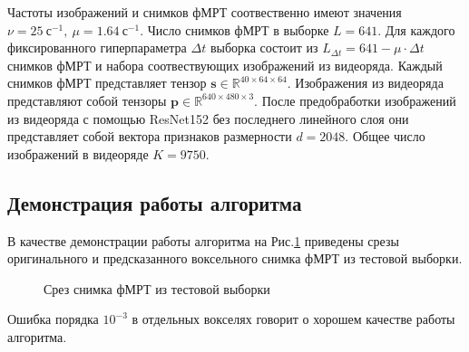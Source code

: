 \documentclass[12pt,twoside]{article}
\begin{document}
Частоты изображений и снимков фМРТ соотвественно имеют значения $\nu = 25~с^{-1},~\mu = 1.64~с^{-1}$.
Число снимков фМРТ в выборке $L = 641$.  
Для каждого фиксированного гиперпараметра $\Delta t$ выборка состоит из $L_{\Delta t} = 641-\mu \cdot \Delta t$  снимков фМРТ и набора соотвествующих изображений из видеоряда. 
Каждый снимков фМРТ представляет тензор $\bm{s} \in \mathbb{R}^{{40} \times {64} \times {64}}$.
Изображения из видеоряда представляют собой тензоры $\bm{p} \in \mathbb{R}^{{640} \times {480} \times {3}}$.
После предобработки изображений из видеоряда с помощью ResNet152 без последнего линейного слоя они представляет собой вектора признаков размерности $d = 2048$. 
Общее число изображений в видеоряде $K = 9750$.

\subsection{Демонстрация работы алгоритма}
В качестве демонстрации работы алгоритма на Рис.\ref{fig:5} приведены срезы оригинального и предсказанного воксельного снимка фМРТ из тестовой выборки.
\begin{figure}[h!]
    \centering
    \hfill
    \hfill
    \caption{Срез снимка фМРТ из тестовой выборки}
    \label{fig:5}
\end{figure}
Ошибка порядка $10^{-3}$ в отдельных вокселях говорит о хорошем качестве работы алгоритма.
\end{document}

